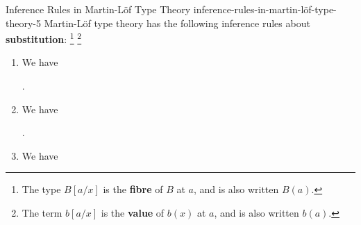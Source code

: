\begin{definition}{Inference Rules in Martin-Löf Type Theory \rmV}{inference-rules-in-martin-löf-type-theory-5}%
    Martin-Löf type theory has the following inference rules about \textbf{substitution}:%
    \footnote{%
        The type $B[a/x]$ is the \textbf{fibre} of $B$ at $a$, and is also written $B(a)$.
    }%
    \footnote{%
        The term $b[a/x]$ is the \textbf{value} of $b(x)$ at $a$, and is also written $b(a)$.
        \par\vspace*{\TCBBoxCorrection}
    }%
    \begin{enumerate}
        \item\label{inference-rules-in-martin-löf-type-theory-5-substitution-in-types}We have
            \begin{webprooftree}%
                \begin{prooftree}%
                \end{prooftree}%
                .%
            \end{webprooftree}%
        \item\label{inference-rules-in-martin-löf-type-theory-5-substitution-in-terms}We have
            \begin{webprooftree}%
                \begin{prooftree}%
                \end{prooftree}%
                .%
            \end{webprooftree}%
        \item\label{inference-rules-in-martin-löf-type-theory-5-substitution-in-judgemental-equality-of-types}We have
            \begin{webprooftree}%

\end{webprooftree}
\end{enumerate}
\end{definition}
